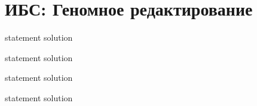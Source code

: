 \chapter{ИБС: Геномное редактирование}

{statement}
{solution}

{statement}
{solution}

{statement}
{solution}

{statement}
{solution}
